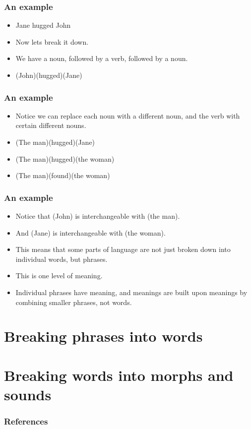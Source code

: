 \documentclass{beamer}
\begin{document}
\begin{frame}
	\frametitle{An example}
	\begin{itemize}
	\item Jane hugged John
	\item Now lets break it down.
	\item We have a noun, followed by a verb, followed by a noun.
	\item (John)(hugged)(Jane)
	\end{itemize}


\end{frame}

\begin{frame}
	\frametitle{An example}
	\begin{itemize}
	\item Notice we can replace each noun with a different noun, and the verb with certain different nouns.
	\item (The man)(hugged)(Jane)
	\item (The man)(hugged)(the woman)
	\item (The man)(found)(the woman)
	\end{itemize}
\end{frame}

\begin{frame}
	\frametitle{An example}
	\begin{itemize}
		\item Notice that (John) is interchangeable with (the man).
		\item And (Jane) is interchangeable with (the woman).
		\item This means that some parts of language are not just broken down into individual words, but phrases.
		\item This is one level of meaning.
		\item Individual phrases have meaning, and meanings are built upon meanings by combining smaller phrases, not words.
	\end{itemize}
\end{frame}

\section{Breaking phrases into words}


\section{Breaking words into morphs and sounds}


\begin{frame}[allowframebreaks]
	\frametitle{References}
	
	
\end{frame}
\end{document}
